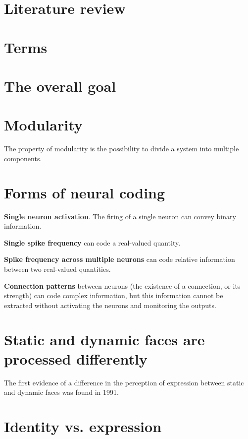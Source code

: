 \section{Literature review}

\section{Terms}

\section{The overall goal}


\section{Modularity}

The property of modularity is the possibility to divide a system into multiple components.

\section{Forms of neural coding}

\begin{itemise}
\item \textbf{Single neuron activation}. The firing of a single neuron can convey binary information.
\item \textbf{Single spike frequency} can code a real-valued quantity.
\item \textbf{Spike frequency across multiple neurons} can code relative information between two real-valued quantities.
\item \textbf{Connection patterns} between neurons (the existence of a connection, or its strength) can code complex information, but this information cannot be extracted without activating the neurons and monitoring the outputs.
\end{itemise}

\section{Static and dynamic faces are processed differently}

The first evidence of a difference in the perception of expression between static and dynamic faces was found in 1991\cite{humphreys1993expression}.


\section{Identity vs. expression}

